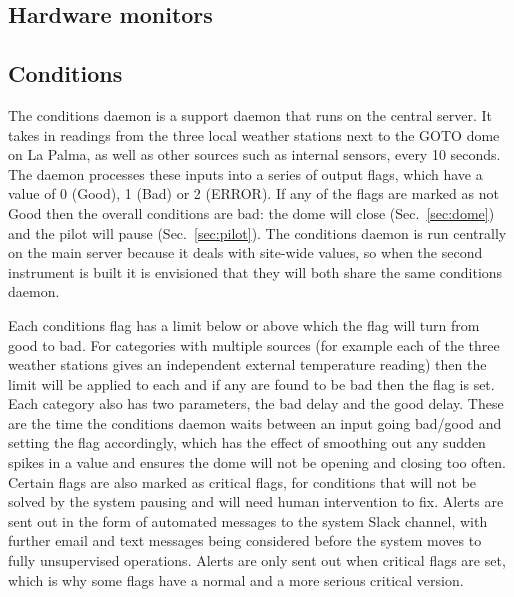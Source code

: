 \begin{colsection}
\begin{colsection}
\end{colsection}


\subsection{Hardware monitors}
\label{sec:monitors}
\begin{colsection}

\lipsum{}

\end{colsection}


\subsection{Conditions}
\label{sec:conditions}
\begin{colsection}

The conditions daemon is a support daemon that runs on the central server. It takes in readings from the three local weather stations next to the GOTO dome on La Palma, as well as other sources such as internal sensors, every 10 seconds. The daemon processes these inputs into a series of output flags, which have a value of 0 (Good), 1 (Bad) or 2 (ERROR). If any of the flags are marked as not Good then the overall conditions are bad: the dome will close (Sec.~\ref{sec:dome}) and the pilot will pause (Sec.~\ref{sec:pilot}). The conditions daemon is run centrally on the main server because it deals with site-wide values, so when the second instrument is built it is envisioned that they will both share the same conditions daemon.

Each conditions flag has a limit below or above which the flag will turn from good to bad. For categories with multiple sources (for example each of the three weather stations gives an independent external temperature reading) then the limit will be applied to each and if any are found to be bad then the flag is set. Each category also has two parameters, the bad delay and the good delay. These are the time the conditions daemon waits between an input going bad/good and setting the flag accordingly, which has the effect of smoothing out any sudden spikes in a value and ensures the dome will not be opening and closing too often. Certain flags are also marked as critical flags, for conditions that will not be solved by the system pausing and will need human intervention to fix. Alerts are sent out in the form of automated messages to the system Slack channel, with further email and text messages being considered before the system moves to fully unsupervised operations. Alerts are only sent out when critical flags are set, which is why some flags have a normal and a more serious critical version.


\end{colsection}
\end{colsection}
